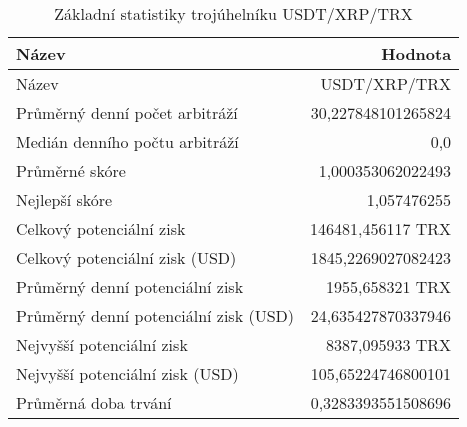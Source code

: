 \begin{table}\centering
\caption{Základní statistiky trojúhelníku USDT/XRP/TRX}
\label{USDTXRPTRX_stats}
\begin{tabular}{|| l | r ||}
\hline Název & Hodnota \\ 
\hline\hline Název & USDT/XRP/TRX \\ 
\hline Průměrný denní počet arbitráží & 30,227848101265824 \\ 
\hline Medián denního počtu arbitráží & 0,0 \\ 
\hline Průměrné skóre & 1,000353062022493 \\ 
\hline Nejlepší skóre & 1,057476255 \\ 
\hline Celkový potenciální zisk & 146481,456117 TRX \\ 
\hline Celkový potenciální zisk (USD) & 1845,2269027082423 \\ 
\hline Průměrný denní potenciální zisk & 1955,658321 TRX \\ 
\hline Průměrný denní potenciální zisk (USD) & 24,635427870337946 \\ 
\hline Nejvyšší potenciální zisk & 8387,095933 TRX \\ 
\hline Nejvyšší potenciální zisk (USD) & 105,65224746800101 \\ 
\hline Průměrná doba trvání & 0,3283393551508696 \\ 
\hline
\end{tabular}
\end{table}